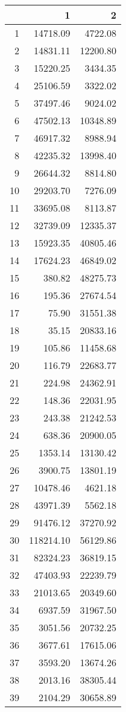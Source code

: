 \begin{table}[ht]
\centering
\begin{tabular}{rrr}
  \hline
 & 1 & 2 \\ 
  \hline
1 & 14718.09 & 4722.08 \\ 
  2 & 14831.11 & 12200.80 \\ 
  3 & 15220.25 & 3434.35 \\ 
  4 & 25106.59 & 3322.02 \\ 
  5 & 37497.46 & 9024.02 \\ 
  6 & 47502.13 & 10348.89 \\ 
  7 & 46917.32 & 8988.94 \\ 
  8 & 42235.32 & 13998.40 \\ 
  9 & 26644.32 & 8814.80 \\ 
  10 & 29203.70 & 7276.09 \\ 
  11 & 33695.08 & 8113.87 \\ 
  12 & 32739.09 & 12335.37 \\ 
  13 & 15923.35 & 40805.46 \\ 
  14 & 17624.23 & 46849.02 \\ 
  15 & 380.82 & 48275.73 \\ 
  16 & 195.36 & 27674.54 \\ 
  17 & 75.90 & 31551.38 \\ 
  18 & 35.15 & 20833.16 \\ 
  19 & 105.86 & 11458.68 \\ 
  20 & 116.79 & 22683.77 \\ 
  21 & 224.98 & 24362.91 \\ 
  22 & 148.36 & 22031.95 \\ 
  23 & 243.38 & 21242.53 \\ 
  24 & 638.36 & 20900.05 \\ 
  25 & 1353.14 & 13130.42 \\ 
  26 & 3900.75 & 13801.19 \\ 
  27 & 10478.46 & 4621.18 \\ 
  28 & 43971.39 & 5562.18 \\ 
  29 & 91476.12 & 37270.92 \\ 
  30 & 118214.10 & 56129.86 \\ 
  31 & 82324.23 & 36819.15 \\ 
  32 & 47403.93 & 22239.79 \\ 
  33 & 21013.65 & 20349.60 \\ 
  34 & 6937.59 & 31967.50 \\ 
  35 & 3051.56 & 20732.25 \\ 
  36 & 3677.61 & 17615.06 \\ 
  37 & 3593.20 & 13674.26 \\ 
  38 & 2013.16 & 38305.44 \\ 
  39 & 2104.29 & 30658.89 \\ 
   \hline
\end{tabular}
\end{table}
